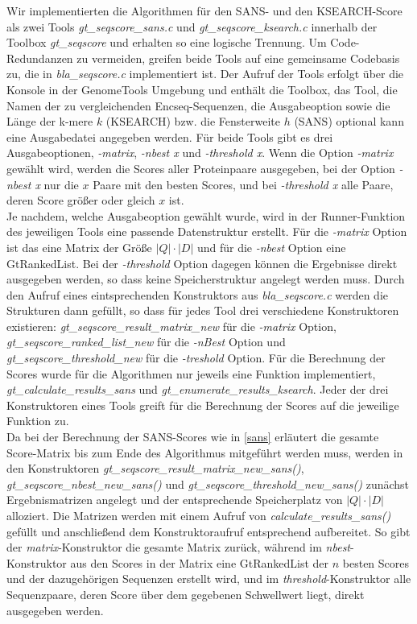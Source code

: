 \documentclass{article}
\begin{document}
Wir implementierten die Algorithmen für den SANS- und den KSEARCH-Score als zwei Tools \emph{gt\_seqscore\_sans.c} und \emph{gt\_seqscore\_ksearch.c} innerhalb der Toolbox \emph{gt\_seqscore} und erhalten so eine logische Trennung. Um Code-Redundanzen zu vermeiden, greifen beide Tools auf eine gemeinsame Codebasis zu, die in \emph{bla\_seqscore.c} implementiert ist. Der Aufruf der Tools erfolgt über die Konsole in der GenomeTools Umgebung und enthält die Toolbox, das Tool, die Namen der zu vergleichenden Encseq-Sequenzen, die Ausgabeoption sowie die Länge der k-mere $k$ (KSEARCH) bzw. die Fensterweite $h$ (SANS) optional kann eine Ausgabedatei angegeben werden.
Für beide Tools gibt es drei Ausgabeoptionen, \emph{-matrix}, \emph{-nbest x} und \emph{-threshold x}. Wenn die Option \emph{-matrix} gewählt wird, werden die Scores aller Proteinpaare ausgegeben, bei der Option \emph{-nbest x} nur die $x$ Paare mit den besten Scores, und bei \emph{-threshold x} alle Paare, deren Score größer oder gleich $x$ ist. \\
Je nachdem, welche Ausgabeoption gewählt wurde, wird in der Runner-Funktion des jeweiligen Tools eine passende Datenstruktur erstellt. Für die \emph{-matrix} Option ist das eine Matrix der Größe $|Q|\cdot|D|$ und für die \emph{-nbest} Option eine GtRankedList. Bei der \emph{-threshold} Option dagegen können die Ergebnisse direkt ausgegeben werden, so dass keine Speicherstruktur angelegt werden muss. Durch den Aufruf eines eintsprechenden Konstruktors aus \emph{bla\_seqscore.c} werden die Strukturen dann gefüllt, so dass für jedes Tool drei verschiedene Konstruktoren existieren:
\emph{gt\_seqscore\_result\_matrix\_new} für die \emph{-matrix} Option, \emph{gt\_seqscore\_ranked\_list\_new} für die \emph{-nBest} Option und \emph{gt\_seqscore\_threshold\_new} für die \emph{-treshold} Option.
Für die Berechnung der Scores wurde für die Algorithmen nur jeweils eine Funktion implementiert, \emph{gt\_calculate\_results\_sans} und \emph{gt\_enumerate\_results\_ksearch}. 
Jeder der drei Konstruktoren eines Tools greift für die Berechnung der Scores auf die jeweilige Funktion zu.\\
Da bei der Berechnung der SANS-Scores wie in \ref{sans} erläutert die gesamte Score-Matrix bis zum Ende des Algorithmus mitgeführt werden muss, werden in den Konstruktoren \emph{gt\_seqscore\_result\_matrix\_new\_sans()}, \emph{gt\_seqscore\_nbest\_new\_sans()} und  \emph{gt\_seqscore\_threshold\_new\_sans()} zunächst Ergebnismatrizen angelegt und der entsprechende Speicherplatz von $|Q|\cdot|D|$ alloziert. Die Matrizen werden mit einem Aufruf von \emph{calculate\_results\_sans()} gefüllt und anschließend dem Konstruktoraufruf entsprechend aufbereitet. So gibt der \emph{matrix}-Konstruktor die gesamte Matrix zurück, während im \emph{nbest}-Konstruktor aus den Scores in der Matrix eine GtRankedList der $n$ besten Scores und der dazugehörigen Sequenzen erstellt wird, und im \emph{threshold}-Konstruktor alle Sequenzpaare, deren Score über dem gegebenen Schwellwert liegt, direkt ausgegeben werden.\\
\end{document}
